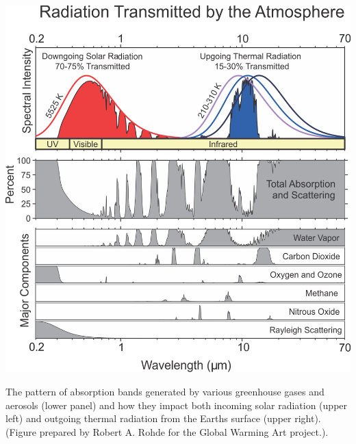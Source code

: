 \documentclass{tufte-book} %
\begin{document}
\begin{marginfigure}[-0.0in]
\includegraphics[width=\linewidth]{ridgwell-and-valdes-Figures.png}
\caption{The pattern of absorption bands generated by various greenhouse gases and aerosols (lower panel) and how they impact both incoming solar radiation (upper left) and outgoing thermal radiation from the Earths surface (upper right). (Figure prepared by Robert A. Rohde for the Global Warming Art project.).}
\label{fig:ch8-blackbody}
\end{marginfigure}
\end{document}
